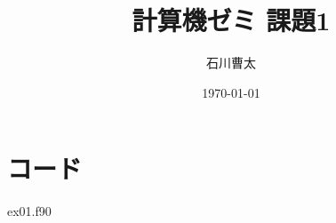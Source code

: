 \documentclass[dvipdfmx]{jsarticle}
\title{計算機ゼミ 課題1}
\author{石川曹太}
\date{\today}
\begin{document}
\maketitle

\section*{コード}
 {ex01.f90}
\end{document}
